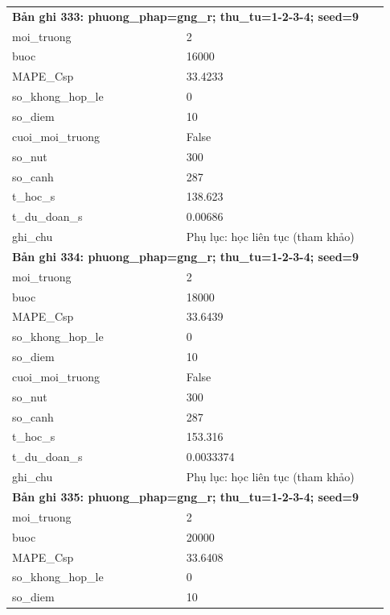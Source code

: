 \begin{longtable}{p{0.43\linewidth}p{0.50\linewidth}}
\midrule
\multicolumn{2}{p{0.95\linewidth}}{\textbf{Bản ghi 333: phuong\_phap=gng\_r; thu\_tu=1-2-3-4; seed=9}} \\
moi\_\allowbreak truong & 2 \\
buoc & 16000 \\
MAPE\_\allowbreak Csp & 33.4233 \\
so\_\allowbreak khong\_\allowbreak hop\_\allowbreak le & 0 \\
so\_\allowbreak diem & 10 \\
cuoi\_\allowbreak moi\_\allowbreak truong & False \\
so\_\allowbreak nut & 300 \\
so\_\allowbreak canh & 287 \\
t\_\allowbreak hoc\_\allowbreak s & 138.623 \\
t\_\allowbreak du\_\allowbreak doan\_\allowbreak s & 0.00686 \\
ghi\_\allowbreak chu & Phụ lục: học liên tục (tham khảo) \\
\midrule
\multicolumn{2}{p{0.95\linewidth}}{\textbf{Bản ghi 334: phuong\_phap=gng\_r; thu\_tu=1-2-3-4; seed=9}} \\
moi\_\allowbreak truong & 2 \\
buoc & 18000 \\
MAPE\_\allowbreak Csp & 33.6439 \\
so\_\allowbreak khong\_\allowbreak hop\_\allowbreak le & 0 \\
so\_\allowbreak diem & 10 \\
cuoi\_\allowbreak moi\_\allowbreak truong & False \\
so\_\allowbreak nut & 300 \\
so\_\allowbreak canh & 287 \\
t\_\allowbreak hoc\_\allowbreak s & 153.316 \\
t\_\allowbreak du\_\allowbreak doan\_\allowbreak s & 0.0033374 \\
ghi\_\allowbreak chu & Phụ lục: học liên tục (tham khảo) \\
\midrule
\multicolumn{2}{p{0.95\linewidth}}{\textbf{Bản ghi 335: phuong\_phap=gng\_r; thu\_tu=1-2-3-4; seed=9}} \\
moi\_\allowbreak truong & 2 \\
buoc & 20000 \\
MAPE\_\allowbreak Csp & 33.6408 \\
so\_\allowbreak khong\_\allowbreak hop\_\allowbreak le & 0 \\
so\_\allowbreak diem & 10 \\

\end{longtable}
